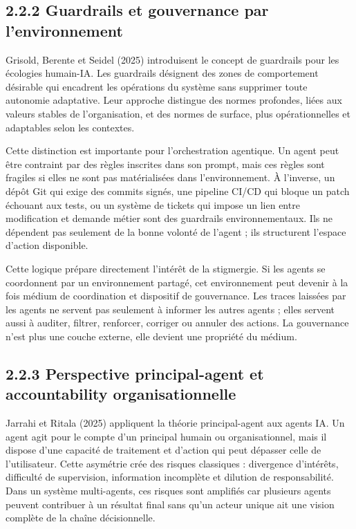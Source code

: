 \subsection{2.2.2 Guardrails et gouvernance par l'environnement}\label{guardrails-et-gouvernance-par-lenvironnement}

Grisold, Berente et Seidel (2025) introduisent le concept de guardrails pour les écologies humain-IA. Les guardrails désignent des zones de comportement désirable qui encadrent les opérations du système sans supprimer toute autonomie adaptative. Leur approche distingue des normes profondes, liées aux valeurs stables de l'organisation, et des normes de surface, plus opérationnelles et adaptables selon les contextes.

Cette distinction est importante pour l'orchestration agentique. Un agent peut être contraint par des règles inscrites dans son prompt, mais ces règles sont fragiles si elles ne sont pas matérialisées dans l'environnement. À l'inverse, un dépôt Git qui exige des commits signés, une pipeline CI/CD qui bloque un patch échouant aux tests, ou un système de tickets qui impose un lien entre modification et demande métier sont des guardrails environnementaux. Ils ne dépendent pas seulement de la bonne volonté de l'agent ; ils structurent l'espace d'action disponible.

Cette logique prépare directement l'intérêt de la stigmergie. Si les agents se coordonnent par un environnement partagé, cet environnement peut devenir à la fois médium de coordination et dispositif de gouvernance. Les traces laissées par les agents ne servent pas seulement à informer les autres agents ; elles servent aussi à auditer, filtrer, renforcer, corriger ou annuler des actions. La gouvernance n'est plus une couche externe, elle devient une propriété du médium.

\subsection{2.2.3 Perspective principal-agent et accountability organisationnelle}\label{perspective-principal-agent-et-accountability-organisationnelle}

Jarrahi et Ritala (2025) appliquent la théorie principal-agent aux agents IA. Un agent agit pour le compte d'un principal humain ou organisationnel, mais il dispose d'une capacité de traitement et d'action qui peut dépasser celle de l'utilisateur. Cette asymétrie crée des risques classiques : divergence d'intérêts, difficulté de supervision, information incomplète et dilution de responsabilité. Dans un système multi-agents, ces risques sont amplifiés car plusieurs agents peuvent contribuer à un résultat final sans qu'un acteur unique ait une vision complète de la chaîne décisionnelle.

